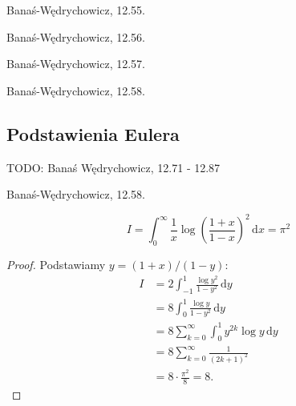 \begin{integral}
    Banaś-Wędrychowicz, 12.55.
\end{integral}

\begin{integral}
    Banaś-Wędrychowicz, 12.56.
\end{integral}

\begin{integral}
    Banaś-Wędrychowicz, 12.57.
\end{integral}

\begin{integral}
    Banaś-Wędrychowicz, 12.58.
\end{integral}

\subsection{Podstawienia Eulera}

TODO: Banaś Wędrychowicz, 12.71 - 12.87

\begin{integral}
    Banaś-Wędrychowicz, 12.58.
\end{integral}

\begin{integral}
    \begin{equation}
        I = \int_0^\infty \frac{1}{x} \log \left(\frac{1+x}{1-x}\right)^2 \,\mathrm{d}x = \pi^2
    \end{equation}
\end{integral}

\begin{proof}
    Podstawiamy $y = (1+x) / (1-y)$:
    \begin{align}
        I & = 2 \int_{-1}^1 \frac{\log y^2}{1-y^2} \,\mathrm{d}y \\
          & = 8 \int_0^1 \frac{\log y}{1-y^2} \, \mathrm{d}{y} \\
          & = 8 \sum_{k=0}^\infty \int_0^1 y^{2k} \log y \,\mathrm{d} y \\
          & = 8 \sum_{k=0}^\infty \frac{1}{(2k+1)^2} \\
          & = 8 \cdot \frac{\pi^2}{8} = 8.
    \end{align}
\end{proof}